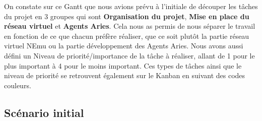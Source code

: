\documentclass[12pt, openany]{report}
\begin{document}
On constate sur ce Gantt que nous avions prévu à l'initiale de découper les tâches du projet en 3 groupes qui sont \textbf{Organisation du projet}, \textbf{Mise en place du réseau virtuel} et \textbf{Agents Aries}. Cela nous as permis de nous séparer le travail en fonction de ce que chacun préfère réaliser, que ce soit plutôt la partie réseau virtuel NEmu ou la partie développement des Agents Aries. Nous avons aussi défini un Niveau de priorité/importance de la tâche à réaliser, allant de 1 pour le plus important à 4 pour le moins important. Ces types de tâches ainsi que le niveau de priorité se retrouvent également sur le Kanban en suivant des codes couleurs.

\subsection{Scénario initial}
\noindent 
\end{document}
